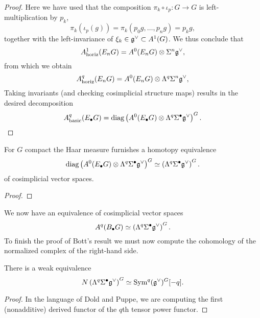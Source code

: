 \documentclass{amsart}
\DeclareMathOperator{\diag}{\text{diag}}
\begin{document}
\begin{proof}
    Here we have used that the composition $\pi_k\circ \iota_p: G\to G$ is
    left-multiplication by $p_k$,
    \begin{equation*}
        \pi_k(\iota_p(g)) = \pi_k(p_0g,\ldots,p_ng) = p_kg,
    \end{equation*}
    together with the left-invariance of $\xi_k\in\mathfrak g^\vee \subset A^1(G)$.
    We thus conclude that
    \begin{equation*}
        A^1_\text{horiz}(E_nG) = A^0(E_nG) \otimes \Sigma^n\mathfrak g^\vee,
    \end{equation*}
    from which we obtain
    \begin{equation*}
        A^q_\text{horiz}(E_nG) = A^0(E_nG) \otimes \Lambda^q\Sigma^n\mathfrak g^\vee,
    \end{equation*}
    Taking invariants (and checking cosimplicial structure maps) results in the 
    desired decomposition
    \begin{equation*}
        A^q_\text{basic}(E_\bullet G) = \diag \left( A^0(E_\bullet G)\otimes 
        \Lambda^q \Sigma^\bullet\fr g^\vee \right)^G.
    \end{equation*}
\end{proof}

\begin{proposition}
    For $G$ compact the Haar measure furnishes a homotopy equivalence
    \begin{equation*}
        \diag\left( A^0(E_\bullet G) \otimes \Lambda^q\Sigma^\bullet\fr 
        g^\vee \right)^G \simeq \left( \Lambda^q\Sigma^\bullet\fr g^\vee 
        \right)^G.
    \end{equation*}
    of cosimplicial vector spaces.
\end{proposition}
\begin{proof}
\end{proof}

We now have an equivalence of cosimplicial vector spaces
\begin{equation*}
    A^q(B_\bullet G) \simeq \left( \Lambda^q\Sigma^\bullet\mathfrak g^\vee \right)^G.
\end{equation*}
To finish the proof of Bott's result we must now compute the cohomology of the 
normalized complex of the right-hand side.
\begin{proposition}
    There is a weak equivalence
    \begin{equation*}
        N\left( \Lambda^q\Sigma^\bullet\mathfrak g^\vee \right)^G
        \simeq \operatorname{Sym}^q(\mathfrak g^\vee)^G[-q].
    \end{equation*}
\end{proposition}
\begin{proof}
    In the language of Dold and Puppe, we are computing the first (nonadditive) 
    derived functor of the $q$th tensor power functor.
\end{proof}
\end{document}
